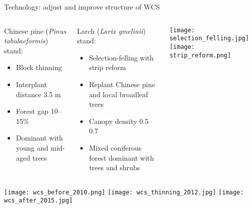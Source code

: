 \begin{frame}{Technology: adjust and improve structure of WCS}
  \vspace{-0.2cm}
  \begin{columns}[T,onlytextwidth]
    \scriptsize
    \begin{exampleblock}{Chinese pine (\emph{Pinus tabulaeformis}) stand:}
      \begin{itemize}
      \item Block thinning
      \item Interplant distance 3.5 m
      \item Forest gap 10--15\%
      \item Dominant with young and mid-aged trees
      \end{itemize}      
    \end{exampleblock}
    \vspace{-0.3cm}
    \begin{exampleblock}{Larch (\emph{Larix gmelinii}) stand:}
      \begin{itemize}
      \item Selection-felling with strip reform
      \item Replant Chinese pine and local broadleaf trees
      \item Canopy density 0.5--0.7
      \item Mixed coniferous forest dominant with trees and shrubs
      \end{itemize}      
    \end{exampleblock}
    \normalsize
    \texttt{[image: selection\_felling.jpg]}
      \texttt{[image: strip\_reform.png]}
  \end{columns}
  \vspace{0.2cm}
  \begin{columns}[T,onlytextwidth]
      \texttt{[image: wcs\_before\_2010.png]}
  \texttt{[image: wcs\_thinning\_2012.jpg]}
    \texttt{[image: wcs\_after\_2015.jpg]}
  \end{columns}  
\end{frame}